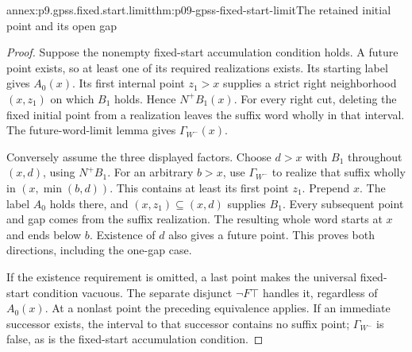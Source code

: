 \begin{annexitem}{annex:p9.gpss.fixed.start.limit}{thm:p09-gpss-fixed-start-limit}{The retained initial point and its open gap}
\begin{proof}
Suppose the nonempty fixed-start accumulation condition holds.
A future point exists, so at least one of its required
realizations exists. Its starting label gives \(A_0(x)\).
Its first internal point \(z_1>x\) supplies a strict
right neighborhood \((x,z_1)\) on which \(B_1\) holds.
Hence \(N^+B_1(x)\). For every right cut, deleting the
fixed initial point from a realization leaves the suffix word
wholly in that interval. The future-word-limit lemma gives
\(\Gamma_{W^-}(x)\).

Conversely assume the three displayed factors. Choose \(d>x\)
with \(B_1\) throughout \((x,d)\), using \(N^+B_1\).
For an arbitrary \(b>x\), use \(\Gamma_{W^-}\) to realize
that suffix wholly in \((x,\min(b,d))\). This contains at
least its first point \(z_1\). Prepend \(x\).
The label \(A_0\) holds there, and
\((x,z_1)\subseteq(x,d)\) supplies \(B_1\).
Every subsequent point and gap comes from the suffix realization.
The resulting whole word starts at \(x\) and ends below \(b\).
Existence of \(d\) also gives a future point. This proves both
directions, including the one-gap case.

If the existence requirement is omitted, a last point makes the
universal fixed-start condition vacuous. The separate disjunct
\(\neg F\top\) handles it, regardless of \(A_0(x)\).
At a nonlast point the preceding equivalence applies. If an
immediate successor exists, the interval to that successor
contains no suffix point; \(\Gamma_{W^-}\) is false, as is
the fixed-start accumulation condition.
\end{proof}
\end{annexitem}

